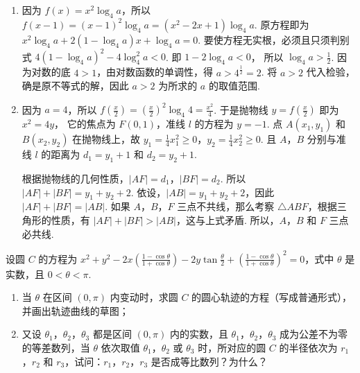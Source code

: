 \begin{solution}
\begin{enumerate}
\item 因为 \(f(x)=x^2\log_4 a\)，所以
\(f(x-1)=\left( x-1 \right)^2\log_4 a=\left( x^2-2x+1 \right)\log_4 a\).
原方程即为
\(x^2\log_4 a+2\left( 1-\log_4 a \right)x+\log_4 a=0\).
要使方程无实根，必须且只须判别式
\(4\left( 1-\log_4 a \right)^2-4\log_4^2 a<0\).
即
\(1-2\log_4 a<0\)，
所以
\(\log_4 a>\frac{1}{2}\).
因为对数的底 \(4>1\)，由对数函数的单调性，得 \(a>4^{\frac{1}{2}}=2\). 将 \(a>2\) 代入检验，确是原不等式的解，因此 \(a>2\) 为所求的 \(a\) 的取值范围.

\item 因为 \(a=4\)，所以
\(f\left( \frac{x}{2} \right)=\left( \frac{x}{2} \right)^2\log_4 4=\frac{x^2}{4}\).
于是抛物线 \(y=f\left( \frac{x}{2} \right)\) 即为
\(x^2=4y\)，
它的焦点为 \(F(0,1)\)，准线 \(l\) 的方程为 \(y=-1\). 点 \(A(x_1,y_1)\) 和 \(B(x_2,y_2)\) 在抛物线上，故 \(y_1=\frac{1}{4}x_1^2\geqslant 0\)，\(y_2=\frac{1}{4}x_2^2\geqslant 0\). 且 \(A\)，\(B\) 分别与准线 \(l\) 的距离为 \(d_1=y_1+1\) 和 \(d_2=y_2+1\).


根据抛物线的几何性质，\(\left| AF \right|=d_1\)，\(\left| BF \right|=d_2\). 所以
\(\left| AF \right|+\left| BF \right|=y_1+y_2+2\).
依设，\(\left| AB \right|=y_1+y_2+2\)，因此
\(\left| AF \right|+\left| BF \right|=\left| AB \right|\).
如果 \(A\)，\(B\)，\(F\) 三点不共线，那么考察 \(\triangle ABF\)，根据三角形的性质，有 \(\left| AF \right|+\left| BF \right|>\left| AB \right|\)，这与上式矛盾. 所以，\(A\)，\(B\) 和 \(F\) 三点必共线.
\end{enumerate}
\end{solution}

\begin{problem}
设圆 \(C\) 的方程为 \(x^2+y^2-2x\left( \frac{1-\cos \theta}{1+\cos \theta} \right)-2y\tan \frac{\theta}{2}+\left( \frac{1-\cos \theta}{1+\cos \theta} \right)^2=0\)，式中 \(\theta\) 是实数，且 \(0<\theta<\pi\).

\begin{enumerate}
\item 当 \(\theta\) 在区间 \((0,\pi)\) 内变动时，求圆 \(C\) 的圆心轨迹的方程（写成普通形式），并画出轨迹曲线的草图；
\item 又设 \(\theta_1\)，\(\theta_2\)，\(\theta_3\) 都是区间 \((0,\pi)\) 内的实数，且 \(\theta_1\)，\(\theta_2\)，\(\theta_3\) 成为公差不为零的等差数列，当 \(\theta\) 依次取值 \(\theta_1\)，\(\theta_2\) 或 \(\theta_3\) 时，所对应的圆 \(C\) 的半径依次为 \(r_1\)，\(r_2\) 和 \(r_3\)，试问：\(r_1\)，\(r_2\)，\(r_3\) 是否成等比数列？为什么？
\end{enumerate}
\end{problem}

